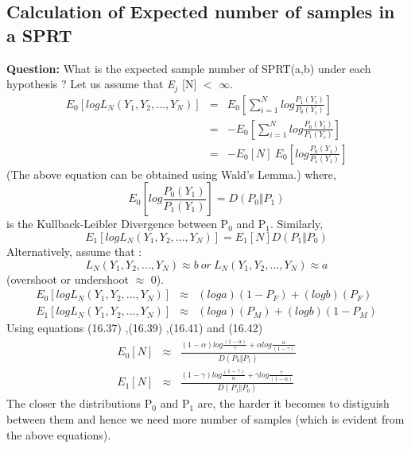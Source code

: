 \documentclass[12pt]{report}
\begin{document}
\subsection{Calculation of Expected number of samples in a SPRT}
\textbf{Question:}
What is the expected sample number of SPRT(a,b) under each hypothesis ?
\newline
Let us assume that \textit{E}$_{j}$ [N] $<$ $\infty$.
\newline
\begin{eqnarray}
\textit{E}_{0}[ log L_{N} (Y_1, Y_2,...,Y_N) ] &=& \textit{E}_{0}[ \sum_{i=1}^{N} log \frac{P_{1}(Y_i)}{P_{0}(Y_i)}]\\
&=& - \textit{E}_{0}[ \sum_{i=1}^{N} log \frac{P_{0}(Y_i)}{P_{1}(Y_i) }]\\
&=& - \textit{E}_{0}[N] \  \textit{E}_{0}[log \frac{P_{0}(Y_1)}{P_{1}(Y_1) }]
\end{eqnarray} 
(The above equation can be obtained using Wald's Lemma.)
\newline
where,
\begin{equation}
{E}_{0}[log \frac{P_{0}(Y_1)}{P_{1}(Y_1) }] = D(P_{0} \Vert P_{1}) 
\end{equation}
\newline
is the Kullback-Leibler Divergence between P$_0$ and P$_1$.
\newline
\newline
Similarly, 
\begin{equation}
\textit{E}_{1}[ log L_{N} (Y_1, Y_2,...,Y_N) ] = \textit{E}_{1}[N] D(P_{1} \Vert P_{0})
\end{equation}
\newline
\newline
Alternatively, assume that $:$
\begin{equation}
L_{N} (Y_1, Y_2,...,Y_N) \approx b \  or \ L_{N} (Y_1, Y_2,...,Y_N) \approx a
\end{equation}
\newline
(overshoot or undershoot $\approx$ 0).
\begin{eqnarray}
\textit{E}_{0}[ log L_{N} (Y_1, Y_2,...,Y_N) ] &\approx & ( log a ) ( 1 - P_{F} ) + ( log b ) ( P_{F} )\\
\textit{E}_{1}[ log L_{N} (Y_1, Y_2,...,Y_N) ] &\approx & ( log a ) ( P_{M} ) + ( log b ) ( 1 - P_{M} )
\end{eqnarray}
\newline
\newline
Using equations (16.37) ,(16.39) ,(16.41) and (16.42) \\
\begin{eqnarray}
\textit{E}_{0}[ N ] &\approx & \frac{(1 - \alpha ) log \frac{(1 - \alpha )}{\gamma} + \alpha log \frac{\alpha}{( 1 - \gamma )} }{D(P_{0} \Vert P_{1})}\\
\textit{E}_{1}[ N ] &\approx & \frac{(1 - \gamma ) log \frac{(1 - \gamma )}{\alpha} + \gamma log \frac{\gamma}{( 1 - \alpha )} }{D(P_{1} \Vert P_{0})}
\end{eqnarray}
\newline
The closer the distributions P$_0$ and P$_1$ are, the harder it becomes to distiguish between them and hence we need more number of samples (which is evident from the above equations).


\end{document}
